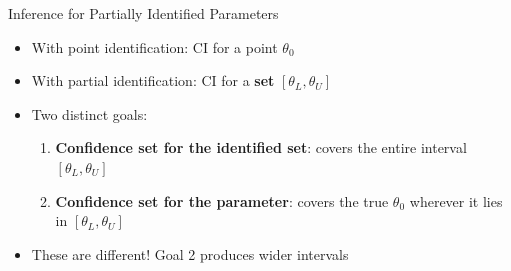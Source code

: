 \documentclass[10pt]{beamer}
\begin{document}


\begin{frame}{Inference for Partially Identified Parameters}
  \begin{itemize}
    \item With point identification: CI for a point $\theta_0$
    \item With partial identification: CI for a \textbf{set} $[\theta_L, \theta_U]$
    \item Two distinct goals:
      \begin{enumerate}
        \item \textbf{Confidence set for the identified set}: covers the entire interval $[\theta_L, \theta_U]$
        \item \textbf{Confidence set for the parameter}: covers the true $\theta_0$ wherever it lies in $[\theta_L, \theta_U]$
      \end{enumerate}
    \item These are different! Goal 2 produces wider intervals
  \end{itemize}
\end{frame}
\end{document}
